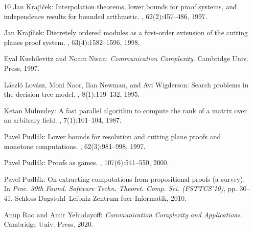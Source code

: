 \documentclass[11pt]{article}
\numberwithin{equation}{section}
\theoremstyle{definition}
\theoremstyle{plain}
\begin{document}
\begin{thebibliography}{10}
{\sc Jan Kraj{\'{\i}}{\v{c}}ek}: Interpolation theorems, lower bounds for proof
  systems, and independence results for bounded arithmetic.
, 62(2):457--486, 1997.
\newblock [\epfmtdoi{10.2307/2275541}]

{\sc Jan Kraj{\'{\i}}{\v{c}}ek}: Discretely ordered modules as a first-order
  extension of the cutting planes proof system.
, 63(4):1582--1596, 1998.
\newblock [\epfmtdoi{10.2307/2586668}]

{\sc Eyal Kushilevitz and Noam Nisan}: {\em Communication Complexity}.
\newblock Cambridge Univ. Press, 1997.

{\sc L{\'a}szl{\'o} Lov{\'a}sz, Moni Naor, Ilan Newman, and Avi Wigderson}:
  Search problems in the decision tree model.
, 8(1):119--132, 1995.
\newblock [\epfmtdoi{10.1137/S0895480192233867}]

{\sc Ketan Mulmuley}: A fast parallel algorithm to compute the rank of a matrix
  over an arbitrary field.
, 7(1):101--104, 1987.
\newblock [\epfmtdoi{10.1007/BF02579205}]

{\sc Pavel Pudl{\'a}k}: Lower bounds for resolution and cutting plane proofs
  and monotone computations.
, 62(3):981--998, 1997.
\newblock [\epfmtdoi{10.2307/2275583}]

{\sc Pavel Pudl{\'a}k}: Proofs as games.
, 107(6):541--550, 2000.
\newblock [\epfmtdoi{10.2307/2589349}]

{\sc Pavel Pudl{\'a}k}: On extracting computations from propositional proofs (a
  survey).
\newblock In {\em Proc. 30th Found. Software Techn. Theoret. Comp. Sci.
  (FSTTCS'10)}, pp. 30--41. Schloss Dagstuhl--Leibniz-Zentrum fuer Informatik,
  2010.

{\sc Anup Rao and Amir Yehudayoff}: {\em Communication Complexity and
  Applications}.
\newblock Cambridge Univ. Press, 2020.
\newblock [\epfmtdoi{10.1017/9781108671644}]


\end{thebibliography}
\end{document}
